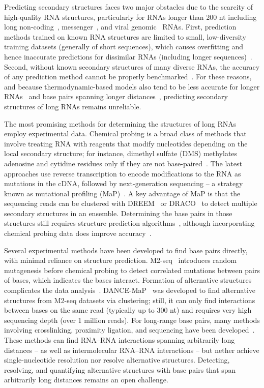 \documentclass[main.tex]{subfiles}
\begin{document}
Predicting secondary structures faces two major obstacles due to the scarcity of high-quality RNA structures, particularly for RNAs longer than 200 nt including long non-coding~\cite{Quinn2016}, messenger~\cite{Lange2012}, and viral genomic~\cite{Nicholson2015} RNAs.
First, prediction methods trained on known RNA structures are limited to small, low-diversity training datasets (generally of short sequences), which causes overfitting and hence inaccurate predictions for dissimilar RNAs (including longer sequences)~\cite{Flamm2022,Sato2023}.
Second, without known secondary structures of many diverse RNAs, the accuracy of any prediction method cannot be properly benchmarked~\cite{Lange2012,Mathews2019}.
For these reasons, and because thermodynamic-based models also tend to be less accurate for longer RNAs~\cite{Nicholson2015} and base pairs spanning longer distances~\cite{Doshi2004}, predicting secondary structures of long RNAs remains unreliable.

The most promising methods for determining the structures of long RNAs employ experimental data.
Chemical probing is a broad class of methods that involve treating RNA with reagents that modify nucleotides depending on the local secondary structure; for instance, dimethyl sulfate (DMS) methylates adenosine and cytidine residues only if they are not base-paired~\cite{Kubota2015}.
The latest approaches use reverse transcription to encode modifications to the RNA as mutations in the cDNA, followed by next-generation sequencing -- a strategy known as mutational profiling (MaP)~\cite{Siegfried2014,Zubradt2016}.
A key advantage of MaP is that the sequencing reads can be clustered with DREEM~\cite{Tomezsko2020} or DRACO~\cite{Morandi2021} to detect multiple secondary structures in an ensemble.
Determining the base pairs in those structures still requires structure prediction algorithms~\cite{Mathews2004a}, although incorporating chemical probing data does improve accuracy~\cite{Cordero2012,Sloma2015}.

Several experimental methods have been developed to find base pairs directly, with minimal reliance on structure prediction.
M2-seq~\cite{Cheng2017} introduces random mutagenesis before chemical probing to detect correlated mutations between pairs of bases, which indicates the bases interact.
Formation of alternative structures complicates the data analysis~\cite{Cordero2015}.
DANCE-MaP~\cite{Olson2022} was developed to find alternative structures from M2-seq datasets via clustering; still, it can only find interactions between bases on the same read (typically up to 300 nt) and requires very high sequencing depth (over 1 million reads).
For long-range base pairs, many methods involving crosslinking, proximity ligation, and sequencing have been developed~\cite{Kudla2020}.
These methods can find RNA--RNA interactions spanning arbitrarily long distances -- as well as intermolecular RNA--RNA interactions -- but nether achieve single-nucleotide resolution nor resolve alternative structures.
Detecting, resolving, and quantifying alternative structures with base pairs that span arbitrarily long distances remains an open challenge.
\end{document}

